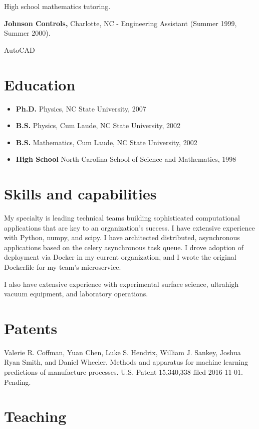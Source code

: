 High school mathematics tutoring.

\textbf{Johnson Controls,} Charlotte, NC - Engineering Assistant (Summer
1999, Summer 2000).

AutoCAD

\section{Education}\label{education}

\begin{itemize}
\tightlist
\item
  \textbf{Ph.D.} Physics, NC State University, 2007
\item
  \textbf{B.S.} Physics, Cum Laude, NC State University, 2002
\item
  \textbf{B.S.} Mathematics, Cum Laude, NC State University, 2002
\item
  \textbf{High School} North Carolina School of Science and Mathematics,
  1998
\end{itemize}

\section{Skills and capabilities}\label{skills-and-capabilities}

My specialty is leading technical teams building sophisticated
computational applications that are key to an organization's success. I
have extensive experience with Python, numpy, and scipy. I have
architected distributed, asynchronous applications based on the celery
asynchronous task queue. I drove adoption of deployment via Docker in my
current organization, and I wrote the original Dockerfile for my team's
microservice.

I also have extensive experience with experimental surface science,
ultrahigh vacuum equipment, and laboratory operations.

\section{Patents}\label{patents}

Valerie R. Coffman, Yuan Chen, Luke S. Hendrix, William J. Sankey,
Joshua Ryan Smith, and Daniel Wheeler. Methods and apparatus for machine
learning predictions of manufacture processes. U.S. Patent 15,340,338
filed 2016-11-01. Pending.

\section{Teaching}\label{teaching}

